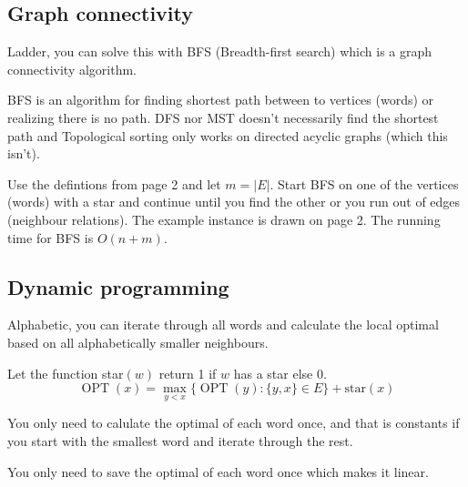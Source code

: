 \documentclass[a4paper]{article}
\newenvironment{task}[1]
{
	\begin{description}[align=right]
		\item [#1]
}{		%
	\end{description}
}
\newcommand{\abs}[1]{\left|#1\right|}
\DeclareMathOperator{\OPT}{OPT}
\DeclareMathOperator{\*}{\cdot}
\begin{document}
\subsection*{Graph connectivity}

\begin{task}{7. (a)}
	 Ladder, you can solve this with BFS (Breadth-first search) which is a graph connectivity algorithm.
\end{task}

\begin{task}{(b)}
	 BFS is an algorithm for finding shortest path between to vertices (words) or realizing there is no path. DFS nor MST doesn't necessarily find the shortest path and Topological sorting only works on directed acyclic graphs (which this isn't).
\end{task}

\begin{task}{(c)}
	\qquad Use the defintions from page 2 and let $m=\abs{E}$. Start BFS on one of the vertices (words) with a star and continue until you find the other or you run out of edges (neighbour relations). The example instance is drawn on page 2. The running time for BFS is $O(n+m)$.
\end{task}

\subsection*{Dynamic programming}

\begin{task}{8. (a)}
	 Alphabetic, you can iterate through all words and calculate the local optimal based on all alphabetically smaller neighbours.
\end{task}

\begin{task}{(b)}
	\qquad Let the function star$(w)$ return 1 if $w$ has a star else 0.
	\[\OPT(x)=\max_{y<x}\{\OPT(y):\{y,x\}\in E\}+\text{star}(x)\]
\end{task}

\begin{task}{(c)}
	 You only need to calulate the optimal of each word once, and that is constants if you start with the smallest word and iterate through the rest.
\end{task}

\begin{task}{(d)}
	 You only need to save the optimal of each word once which makes it linear.
\end{task}
\end{document}

